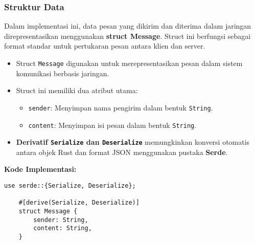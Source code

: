 \subsubsection{Struktur Data}

Dalam implementasi ini, data pesan yang dikirim dan diterima dalam jaringan direpresentasikan menggunakan \textbf{struct Message}. Struct ini berfungsi sebagai format standar untuk pertukaran pesan antara klien dan server.

\begin{itemize}
	\item Struct \texttt{Message} digunakan untuk merepresentasikan pesan dalam sistem komunikasi berbasis jaringan.
	\item Struct ini memiliki dua atribut utama:
	\begin{itemize}
		\item \texttt{sender}: Menyimpan nama pengirim dalam bentuk \texttt{String}.
		\item \texttt{content}: Menyimpan isi pesan dalam bentuk \texttt{String}.
	\end{itemize}
	\item \textbf{Derivatif \texttt{Serialize} dan \texttt{Deserialize}} memungkinkan konversi otomatis antara objek Rust dan format JSON menggunakan pustaka \textbf{Serde}.
\end{itemize}

\textbf{Kode Implementasi:}

\begin{lstlisting}[style=RustStyle]
	use serde::{Serialize, Deserialize};
	
	#[derive(Serialize, Deserialize)]
	struct Message {
		sender: String,
		content: String,
	}
\end{lstlisting}

